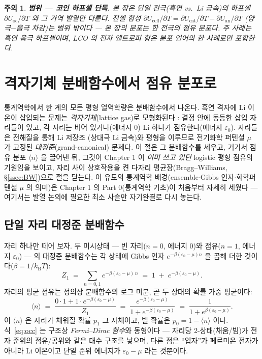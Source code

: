 \documentclass[11pt,a4paper]{article}
\newtheorem*{warnbox}{주의}
\newcommand{\oc}{\mathrm{oc}}
\newcommand{\kB}{k_{\mathrm B}}
\newcommand{\avg}[1]{\langle #1\rangle}
\begin{document}
\begin{warnbox}
\textbf{범위 — 코인 하프셀 단독.} 본 장은 단일 전극(흑연 vs.\ Li 금속)의 하프셀 $\partial U_\oc/\partial T$ 와
그 가역 발열만 다룬다. 전셀 합성 $\partial U_\mathrm{cell}/\partial T=\partial U_\mathrm{cat}/\partial T-\partial
U_\mathrm{an}/\partial T$ (양극$-$음극 차감)는 \emph{범위 밖}이다 — 본 장의 분포는 한 전극의 점유 분포다.
주 사례는 흑연 음극 하프셀이며, LCO 의 전자 엔트로피 항은 분포 언어의 한 사례로만 포함한다.
\end{warnbox}

\section{격자기체 분배함수에서 점유 분포로}\label{sec:partition}
통계역학에서 한 계의 모든 평형 열역학량은 분배함수에서 나온다. 흑연 격자에 Li 이온이 삽입되는 문제는
\emph{격자기체}(lattice gas)로 모형화된다 \cite{newman,huggins2009}: 결정 안에 동등한 삽입 자리들이 있고,
각 자리는 비어 있거나(에너지 0) Li 하나가 점유한다(에너지 $\varepsilon_0$). 자리들은 전해질을 통해 Li 저장조
(상대극 Li 금속)와 평형을 이루므로 전기화학 퍼텐셜 $\mu$ 가 고정된 \emph{대정준}(grand-canonical) 문제다.
이 절은 그 분배함수를 세우고, 거기서 점유 분포 $\avg{n}$ 을 끌어낸 뒤, 그것이 Chapter 1 이 \emph{이미 쓰고
있던} logistic 평형 점유의 기원임을 보이고, 자리 사이 상호작용을 켠 다자리 평균장(Bragg--Williams,
\S\ref{ssec:BW})으로 절을 닫는다. 이 유도의 통계역학 배경(ensemble$\cdot$Gibbs 인자$\cdot$화학퍼텐셜
$\mu$ 의 의미)은 Chapter 1 의 Part 0(통계역학 기초)이 처음부터 자세히 세웠다 — 여기서는 발열 논의에 필요한
최소 사슬만 자기완결로 다시 놓는다.

\subsection{단일 자리 대정준 분배함수}
자리 하나만 떼어 보자. 두 미시상태 — 빈 자리($n=0$, 에너지 0)와 점유($n=1$, 에너지 $\varepsilon_0$) — 의
대정준 분배함수는 각 상태에 Gibbs 인자 $e^{-\beta(\varepsilon_0-\mu)n}$ 을 곱해 더한 것이다($\beta=1/\kB T$):
\begin{equation}
Z_1 \;=\; \sum_{n=0,1} e^{-\beta(\varepsilon_0-\mu)\,n}
\;=\; 1 \;+\; e^{-\beta(\varepsilon_0-\mu)}.
\label{eq:Z1}
\end{equation}
자리의 평균 점유는 정의상 분배함수의 로그 미분, 곧 두 상태의 확률 가중 평균이다:
\begin{equation}
\avg{n} \;=\; \frac{0\cdot 1 + 1\cdot e^{-\beta(\varepsilon_0-\mu)}}{Z_1}
\;=\; \frac{e^{-\beta(\varepsilon_0-\mu)}}{1+e^{-\beta(\varepsilon_0-\mu)}}
\;=\; \frac{1}{1+e^{\beta(\varepsilon_0-\mu)}}.
\label{eq:occ}
\end{equation}
이 $\avg{n}$ 은 자리가 채워질 확률 $p_1$ 그 자체이고, 빌 확률은 $p_0=1-\avg{n}$ 이다. 식~\eqref{eq:occ} 는
구조상 \emph{Fermi--Dirac 함수}와 동형이다 — 자리당 2-상태(채움/빔)가 전자 준위의 점유/공위와 같은
대수 구조를 낳으며, 다른 점은 ``입자''가 페르미온 전자가 아니라 Li 이온이고 단일 준위 에너지가
$\varepsilon_0-\mu$ 라는 것뿐이다.
\end{document}
